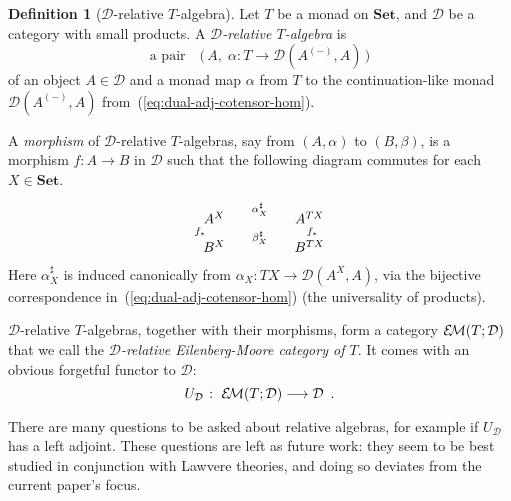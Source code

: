 \documentclass[9pt, preprint]{sigplanconf}
\theoremstyle{theorem}
\theoremstyle{definition}
\newtheorem{definition}[theorem]{Definition}
\newcommand{\cat}[1]{\mathcal{#1}}
\newcommand{\place}{{-}}
\newcommand{\Set}{\mathbf{Set}}
\newcommand{\Sets}{\Set}
\newcommand{\EM}{\mathcal{E}{\kern-.5ex}\mathcal{M}}
\newcommand{\longto}{\longrightarrow}
\begin{document}
\begin{definition}[$\cat{D}$-relative $T$-algebra]
  \label{def:relative-emcat}
  Let $T$ be a monad on $\Sets$, and $\cat{D}$ be a category with small
 products.
A \emph{$\cat{D}$-relative $T$-algebra} is
\begin{displaymath}
 \text{a pair} \quad
 \bigl(\,A,\; \alpha\colon T \to \cat{D}(A^{(\place)}, A)\,\bigr)
\end{displaymath}
 of an object $A\in\cat{D}$ and a monad map $\alpha$ from $T$ to the
 continuation-like monad
 $\cat{D}(A^{(\place)}, A)$ from~(\ref{eq:dual-adj-cotensor-hom}).

 A \emph{morphism} of $\cat{D}$-relative $T$-algebras, say from
 $(A,\alpha)$ to $(B,\beta)$, is a morphism $f \colon A \to B$ in
 $\cat{D}$ such that the following diagram commutes for each $X \in
 \Set$.
      \begin{align*}
        \xymatrix@R-1.8em@C+2em{
          A^X \ar[r]^-{\alpha_X^{\sharp}} \ar@<-0.3em>[d]_-{f_*}
          & A^{TX} \ar@<-0.5em>[d]^-{f_*} \\
          B^X \ar[r]^-{\beta_X^{\sharp}}
          & B^{TX}
        }
      \end{align*}
  Here $\alpha^{\sharp}_{X}$ is induced canonically from
 $\alpha_{X}\colon TX\to \cat{D}(A^{X}, A)$, via the bijective
 correspondence in~(\ref{eq:dual-adj-cotensor-hom}) (the
 universality of products).

 $\cat{D}$-relative $T$-algebras, together with
 their morphisms, form a category $\EM(T; \cat{D})$ that we call the
 \emph{$\cat{D}$-relative Eilenberg-Moore category of $T$}. It comes with
 an obvious forgetful functor to $\cat{D}$:
 \begin{equation}\label{eq:forgetfulFunctorForRelativeAlg}
   U_{\cat{D}}\; \colon\; \EM(T;\cat{D}) \longto \cat{D} \enspace.
 \end{equation}
\end{definition}

There are many questions to be asked about relative algebras, for
example if $U_{\cat{D}}$ has a left adjoint. These questions are left as
future work: they seem to be best studied in conjunction with Lawvere
theories, and doing so deviates from the current paper's focus.
\end{document}
